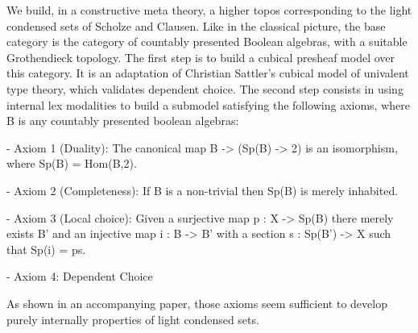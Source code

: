 We build, in a constructive meta theory, a higher topos corresponding to the light condensed sets of Scholze and Clausen.
Like in the classical picture, the base category is the category of countably presented Boolean algebras, with a suitable Grothendieck topology.
The first step is to build a cubical presheaf model over this category. It is an adaptation of Christian Sattler's cubical model of univalent type theory, which validates dependent choice. The second step consists in using internal lex modalities to build a submodel satisfying the following axioms, where B is any countably presented boolean algebras:

- Axiom 1 (Duality): The canonical map B -> (Sp(B) -> 2) is an isomorphism, where Sp(B) = Hom(B,2).

- Axiom 2 (Completeness): If B is a non-trivial then Sp(B) is merely inhabited.

- Axiom 3 (Local choice): Given a surjective map p : X -> Sp(B) there merely exists B' and an injective map
i : B -> B' with a section s : Sp(B') -> X such that Sp(i) = ps.

- Axiom 4: Dependent Choice

As shown in an accompanying paper, those axioms seem sufficient to develop purely internally properties of light condensed sets.